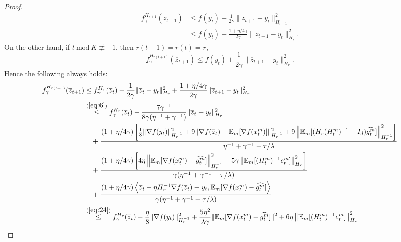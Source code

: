 \documentclass{article} %
\numberwithin{equation}{section}
\renewcommand{\eqref}[1]{(\ref{#1})}
\begin{document}
\begin{proof}
\begin{equation}
    \end{equation}
    \begin{equation}
        \begin{aligned}
            f_\gamma^{H_{r+1}}(\overline{z}_{t+1}) 
            &\leq f(y_t) +\frac{1}{2\gamma}\| \overline{z}_{t+1}-y_t\|_{H_{r+1}}^2 \\
            &\leq f(y_t)+\frac{1+\eta/4\gamma}{2\gamma}\| \overline{z}_{t+1}-y_t\|_{H_r}^2.
        \end{aligned}
    \end{equation}
    On the other hand, if $t\ \text{mod}\ K \not\equiv -1 $, then $r(t+1)=r(t)=r$,
    \begin{equation}
        f_\gamma^{H_{r(t+1)}}(\overline{z}_{t+1}) 
        \leq f(y_t) +\frac{1}{2\gamma}\| \overline{z}_{t+1}-y_t\|_{H_r}^2.
    \end{equation}
    Hence the following always holds:
    \begin{equation}
        \begin{aligned}
            f_\gamma^{H_{r(t+1)}}(\overline{z}_{t+1}) 
            &\leq f_\gamma^{H_r}(\overline{z}_t)-\frac{1}{2\gamma}\|\overline{z}_t-y_t\|_{H_r}^2+\frac{1+\eta/4\gamma}{2\gamma}\| \overline{z}_{t+1}-y_t\|_{H_r}^2 \\
            &\overset{\eqref{eq:6}}{\leq} f_\gamma^{H_r}(\overline{z}_t) - \frac{7\gamma^{-1}}{8\gamma(\eta^{-1}+\gamma^{-1})}\|\overline{z}_t-y_t\|_{H_r}^2 \\
            &\quad + \frac{(1+\eta/4\gamma)\left[ \frac{1}{8}\|\nabla f(y_t)\|_{H_r^{-1}}^2 + 9 \|\nabla f(\overline{z}_t)-\expect_m[\nabla f(x_t^m)]\|_{H_r^{-1}}^2 + 9 \left\|\expect_m [(H_r(H_t^m)^{-1}-I_d)\widehat{g_t^m}]\right\|_{H_r^{-1}}^2 \right]}{\eta^{-1} +\gamma^{-1}-\tau/\lambda} \\
            &\quad + \frac{(1+\eta/4\gamma)\left[ 4\eta \left\| \expect_m[\nabla f(x_t^m)-\widehat{g_t^m}]\right\|_{H_r^{-1}}^2 + 5\gamma \left\| \expect_m[(H_t^m)^{-1}e_t^m] \right\|_{H_r}^2 \right]}{\gamma(\eta^{-1} +\gamma^{-1}-\tau/\lambda)} \\
            &\quad + \frac{(1+\eta/4\gamma)\left\langle \overline{z}_{t}-\eta H_r^{-1}\nabla f(\overline{z}_t)-y_t, \expect_m[\nabla f(x_t^m)-\widehat{g_t^m}]\right\rangle }{\gamma(\eta^{-1} +\gamma^{-1}-\tau/\lambda)} \\
            &\overset{\eqref{eq:24}}{\leq} f_\gamma^{H_r}(\overline{z}_t) - \frac{\eta}{8} \|\nabla f(y_t)\|_{H_r^{-1}}^2 + \frac{5\eta^2}{\lambda\gamma} \|\expect_m[\nabla f(x_t^m)-\widehat{g_t^m}]\|^2 + 6\eta \left\| \expect_m[(H_t^m)^{-1}e_t^m] \right\|_{H_r}^2 \\

\end{aligned}
\end{equation}
\end{proof}
\end{document}
